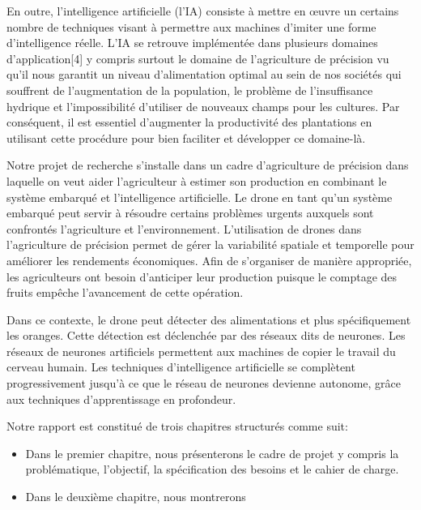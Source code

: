En outre, l’intelligence artificielle (l’IA) consiste à mettre en œuvre un certains nombre de techniques visant à permettre aux machines d'imiter une forme d'intelligence réelle. L'IA se retrouve implémentée dans plusieurs domaines d'application[4] y compris surtout le domaine de l’agriculture de précision vu qu'il nous garantit un niveau d'alimentation optimal au sein de nos sociétés qui souffrent de l’augmentation de la population, le problème de l’insuffisance hydrique et l’impossibilité d’utiliser de nouveaux champs pour les cultures. Par conséquent, il est essentiel d’augmenter la productivité des plantations en utilisant cette procédure pour bien faciliter et développer ce domaine-là.



Notre projet de recherche s’installe dans un cadre d’agriculture de précision dans laquelle on veut aider l’agriculteur à estimer son production en combinant le système embarqué et l’intelligence artificielle. Le drone en tant qu’un système embarqué peut servir à résoudre certains problèmes urgents auxquels sont confrontés l'agriculture et l'environnement. L'utilisation de drones dans l'agriculture de précision permet de gérer la variabilité spatiale et temporelle pour améliorer les rendements économiques. Afin de s’organiser de manière appropriée, les agriculteurs ont besoin d’anticiper leur production puisque le comptage des fruits empêche l'avancement de cette opération.



Dans ce contexte, le drone peut détecter des alimentations et plus spécifiquement les oranges. Cette détection est déclenchée par des réseaux dits de neurones. Les réseaux de neurones artificiels permettent aux machines de copier le travail du cerveau humain. Les techniques d'intelligence artificielle se complètent progressivement jusqu'à ce que le réseau de neurones devienne autonome, grâce aux techniques d'apprentissage en profondeur.


Notre rapport est constitué de trois chapitres structurés comme suit:

\begin{itemize}
	\item Dans le premier chapitre, nous présenterons le cadre de projet y compris la problématique, l'objectif, la spécification des besoins et le cahier de charge.
	\item Dans le deuxième chapitre, nous montrerons 
\end{itemize}

	
	
	
	
	
	
	
	
